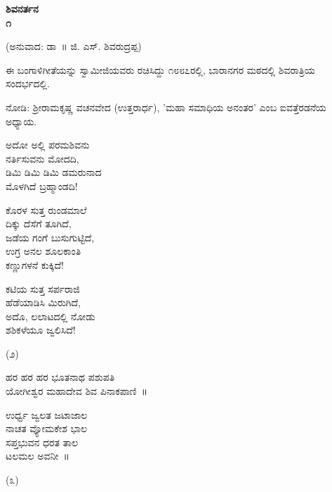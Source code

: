 \begin{center}
\textbf{ಶಿವನರ್ತನ\\೧}
\end{center}

\begin{center}
(ಅನುವಾದ: ಡಾ~॥ ಜಿ. ಎಸ್. ಶಿವರುದ್ರಪ್ಪ)
\end{center}

ಈ ಬಂಗಾಳಿಗೀತೆಯನ್ನು ಸ್ವಾಮೀಜಿಯವರು ರಚಿಸಿದ್ದು ೧೮೮೭ರಲ್ಲಿ, ಬಾರಾನಗರ ಮಠದಲ್ಲಿ ಶಿವರಾತ್ರಿಯ ಸಂದರ್ಭದಲ್ಲಿ.

ನೋಡಿ: ಶ‍್ರೀರಾಮಕೃಷ್ಣ ವಚನವೇದ (ಉತ್ತರಾರ್ಧ), 'ಮಹಾ ಸಮಾಧಿಯ ಅನಂತರ' ಎಂಬ ಐವತ್ತೆರಡನೆಯ ಅಧ್ಯಾಯ.

\begin{myquote}
ಅದೋ ಅಲ್ಲಿ ಪರಮಶಿವನು\\ನರ್ತಿಸುವನು ಮೋದದಿ,\\ಡಿಮಿ ಡಿಮಿ ಡಿಮಿ ಡಮರುನಾದ\\ಮೊಳಗಿದೆ ಬ್ರಹ್ಮಾಂಡದಿ!
\end{myquote}

\begin{myquote}
ಕೊರಳ ಸುತ್ತ ರುಂಡಮಾಲೆ\\ದಿಕ್ಕು ದೆಸೆಗೆ ತೂಗಿದೆ,\\ಜಡೆಯ ಗಂಗೆ ಬುಸುಗುಟ್ಟಿದೆ,\\ಉಗ್ರ ಅನಲ ಶೂಲಕಾಂತಿ\\ಕಣ್ಣುಗಳನೆ ಕುಕ್ಕಿದೆ!
\end{myquote}

\begin{myquote}
ಕಟಿಯ ಸುತ್ತ ಸರ್ಪರಾಜಿ\\ಹೆಡೆಯಾಡಿಸಿ ಮಿರುಗಿದೆ,\\ಅದೊ, ಲಲಾಟದಲ್ಲಿ ನೋಡು\\ಶಶಿಕಳೆಯೂ ಜ್ವಲಿಸಿದೆ!
\end{myquote}

\begin{center}
(೨)
\end{center}

\begin{myquote}
ಹರ ಹರ ಹರ ಭೂತನಾಥ ಪಶುಪತಿ\\ಯೋಗೀಶ್ವರ ಮಹಾದೇವ ಶಿವ ಪಿನಾಕಪಾಣಿ~॥
\end{myquote}

\begin{myquote}
ಉರ್ಧ್ವ ಜ್ವಲತ ಜಟಾಜಾಲ\\ನಾಚತ ವ್ಯೋಮಕೇಶ ಭಾಲ\\ಸಪ್ತಭುವನ ಧರತ ತಾಲ\\ಟಲಮಲ ಅವನೀ~॥
\end{myquote}

\begin{center}
(೩)
\end{center}

